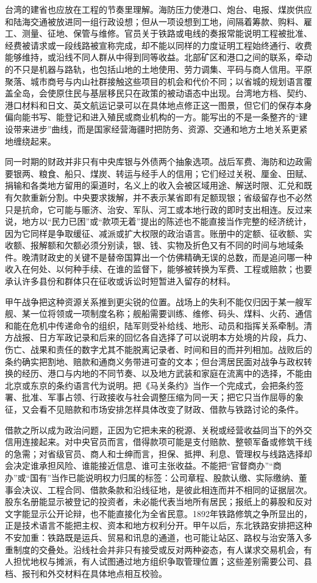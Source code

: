 台湾的建省也应放在工程的节奏里理解。海防压力使港口、炮台、电报、煤炭供应和陆海交通被放进同一组行政设想；但从一项设想到工地，间隔着筹款、购料、雇工、测量、征地、保管与维修。官员关于铁路或电线的奏报常能说明工程被批准、经费被请求或一段线路被宣称完成，却不能以同样的力度证明工程始终通行、收费能够维持，或沿线不同人群从中得到同等收益。北部矿区和港口之间的联系，牵动的不只是机器与路轨，也包括山地的土地使用、劳力调集、平码与商人信用。平原聚落、城市商号与内山社群接触这些项目的机会和代价不同；以省城的规划语言覆盖全岛，会使原住民与基层移民只在政策的被动语态中出现。台湾地方档、契约、港口材料和日文、英文航运记录可以在具体地点修正这一图景，但它们的保存本身偏向能书写、能登记和进入殖民或商业机构的一方。能写出的不是一条整齐的“建设带来进步”曲线，而是国家经营海疆时把防务、资源、交通和地方土地关系更紧地缠绕起来。

同一时期的财政并非只有中央库银与外债两个抽象选项。战后军费、海防和边政需要银两、粮食、船只、煤炭、转运与经手人的信用；它们经过关税、厘金、田赋、捐输和各类地方留用的渠道时，名义上的收入会被区域用途、解送时限、汇兑和既有欠款重新分割。中央要求拨解，并不表示某省即有足额现银；省级留存也不必然只是抗命，它可能与赈济、治安、军队、河工或本地行政的即时支出相连。反过来说，地方以“民力已困”或“款项无着”提出的陈述也不能直接当作完整的经济统计，因为它同样是争取缓征、减派或扩大权限的政治语言。账册中的定额、征收额、实收额、报解额和欠额必须分别读，银、钱、实物及折色又有不同的时间与地域条件。晚清财政史的关键不是替帝国算出一个仿佛精确无误的总数，而是追问哪一种收入在何处、以何种手续、在谁的监督下，能够被转换为军费、工程或赔款；也要承认许多县份和群体只在征收或诉讼时短暂进入留存的材料。

甲午战争把这种资源关系推到更尖锐的位置。战场上的失利不能仅归因于某一艘军舰、某一位将领或一项制度名称；舰船需要训练、维修、码头、煤料、火药、通信和能在危机中传递命令的组织，陆军则受补给线、地形、动员和指挥关系牵制。清方战报、日方军政记录和后来的回忆各自选择了可以说明本方处境的片段，兵力、伤亡、战果和责任的数字尤其不能脱离记录者、时间和目的而并列相加。战败后的条约确实把割地、赔款和通商义务带进可查的文本；但台湾居民面对战争与政权转换的经历、港口与内地的不同节奏、以及地方武装和家庭在流离中的选择，不能由北京或东京的条约语言代为说明。把《马关条约》当作一个完成式，会把条约签署、批准、军事占领、行政接收与社会调整压缩为同一天；把它只当作屈辱的象征，又会看不见赔款和市场安排怎样具体改变了财政、借款与铁路讨论的条件。

借款之所以成为政治问题，正因为它把未来的税源、关税或经营收益同当下的外交信用连接起来。对中央官员而言，借得款项可能是支付赔款、整顿军备或修筑干线的急需；对省级官员、商人和士绅而言，担保、抵押、利息、管理权与线路选择却会决定谁承担风险、谁能接近信息、谁可主张收益。不能把“官督商办”“商办”或“国有”当作已能说明权力归属的标签：公司章程、股款认缴、实际缴纳、董事会决议、工程合同、借款条款和沿线征地，是彼此相连而并不相同的证据层次。股东名册能显示被登记的投资者，未必能代表当地所有居民；报纸上的募股和反对文字能显示公开论辩，也不能直接化为全省民意。1892年铁路修筑之争所显出的，正是技术语言不能把主权、资本和地方权利分开。甲午以后，东北铁路安排把这种不安加重：铁路既是运兵、贸易和讯息的通道，也可能让站区、路权与治安落入多重制度的交叠处。沿线社会并非只有接受或反对两种姿态，有人谋求交易机会，有人担忧地权与摊派，有人试图通过地方组织争取管理位置；这些差别需要公司、县档、报刊和外交材料在具体地点相互校验。

